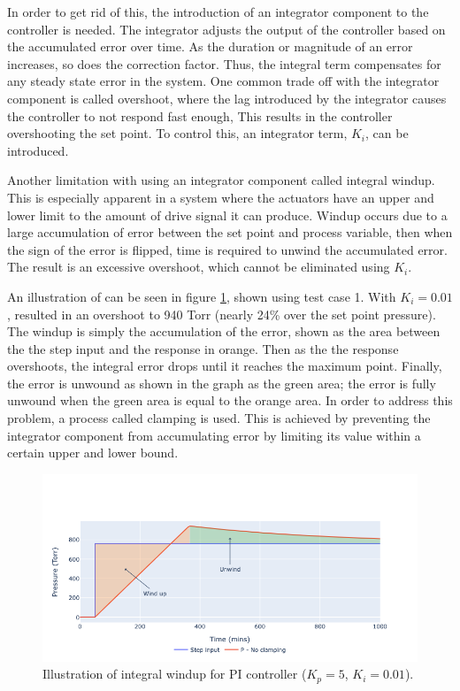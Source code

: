 In order to get rid of this, the introduction of an integrator component to the controller is needed. The integrator adjusts the output of the controller based on the accumulated error over time. As the duration or magnitude of an error increases, so does the correction factor. Thus, the integral term compensates for any steady state error in the system. One common  trade off with the integrator component is called overshoot, where the lag introduced by the integrator causes the controller to not respond fast enough, This results in the controller overshooting the set point. To control this, an integrator term, $K_i$, can be introduced. 


Another limitation with using an integrator component called integral windup. This is especially apparent in a system where the actuators have an upper and lower limit to the amount of drive signal it can produce. Windup occurs due to a large accumulation of error between the set point and process variable, then when the sign of the error is flipped, time is required to unwind the accumulated error. The result is an excessive overshoot, which cannot be eliminated using $K_i$. 


An illustration of can be seen in figure \ref{fig:windup}, shown using test case 1. With $K_i=0.01$, resulted in an overshoot to 940 Torr (nearly 24\% over the set point pressure). The windup is simply the accumulation of the error, shown as the area between the the step input and the response in orange. Then as the the response overshoots, the integral error drops until it reaches the maximum point. Finally, the error is unwound as shown in the graph as the green area; the error is fully unwound when the green area is equal to the orange area. In order to address this problem, a process called clamping is used. This is achieved by preventing the integrator component from accumulating error by limiting its value within a certain upper and lower bound. 

\begin{figure}[h!]
	\centering
	\includegraphics[width=\linewidth]{chapter_5/figures/windup.png}
	\caption{Illustration of integral windup for PI controller ($K_p = 5$, $K_i = 0.01$).}
	\label{fig:windup}
\end{figure}

